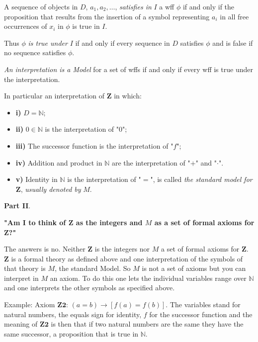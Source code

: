 \documentclass[12pt]{article}
\begin{document}
A sequence of objects in $D$, $a_1, a_2, \ldots$, \emph{satisfies in} $I$ a wff $\phi$ if and only if the proposition that results from the insertion of a symbol representing $a_i$ in all free occurrences of $x_i$ in $\phi$ is true in $I$.

Thus $\phi$ \emph{is true under} $I$ if and only if every sequence in $D$ satisfies $\phi$ and is false if no sequence satisfies $\phi$.

\emph{An interpretation is a Model} for a set of wffs if and only if every wff is true under the interpretation.

In particular an interpretation of $\textbf{Z}$ in which:

\begin{itemize}
\item \textbf{i)} $D = \mathbb{N}$;

\item \textbf{ii)} $0 \in \mathbb{N}$ is the interpretation of "$0$";

\item \textbf{iii)} The successor function is the interpretation of "$f$";

\item \textbf{iv)} Addition and product in $\mathbb{N}$ are the interpretation of "$+$" and "$\cdot$".

\item \textbf{v)} Identity in $\mathbb{N}$ is the interpretation of "$=$", is called \emph{the standard model for} $\textbf{Z}$, \emph{usually denoted by} $M$.
\end{itemize}

\begin{large}
\textbf{Part II}.
\end{large}

\textbf{"Am I to think of $\textbf{Z}$ as the integers and $M$ as a set of formal axioms for $\textbf{Z}$?"}

The answers is no. Neither $\textbf{Z}$ is the integers nor $M$ a set of formal axioms for $\textbf{Z}$. $\textbf{Z}$ is a formal theory as defined above and one interpretation of the symbols of that theory is $M$, the standard Model. So $M$ is not a set of axioms but you can interpret in $M$ an axiom. To do this one lets the individual variables range over $\mathbb{N}$ and one interprets the other symbols as specified above.

Example: Axiom $\textbf{Z2}$: $(a = b) \rightarrow [f (a) = f (b)]$. The variables stand for natural numbers, the equals sign for identity, $f$ for the successor function and the meaning of $\textbf{Z2}$ is then that if two natural numbers are the same they have the same successor, a proposition that is true in $\mathbb{N}$.
\end{document}
